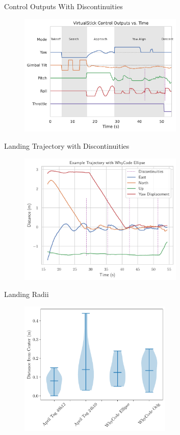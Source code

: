 \documentclass[aspectratio=169]{beamer}
\begin{document}
\begin{frame}{Control Outputs With Discontinuities}
	\begin{figure}
		\centering
		\includegraphics[width=0.7\textwidth]{./images/control_example_with_discontinuities}
	\end{figure}
\end{frame}

\begin{frame}{Landing Trajectory with Discontinuities}
	\begin{figure}
		\centering
		\includegraphics[width=0.7\textwidth]{./images/landing_trajectory_with_discontinuities}
	\end{figure}
\end{frame}

\begin{frame}{Landing Radii}
	\begin{figure}
		\centering
		\includegraphics[width=0.65\textwidth]{./images/violin_plot_landing_radii}
	\end{figure}
\end{frame}
\end{document}
